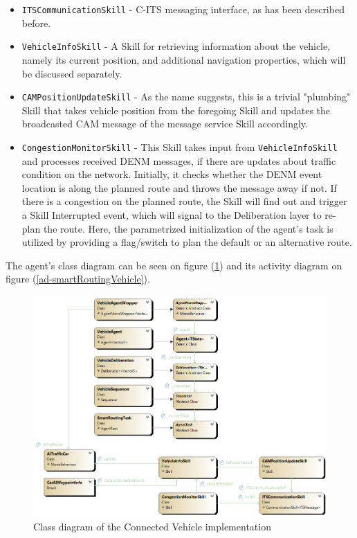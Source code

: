 \documentclass[main.tex]{subfiles}
\begin{document}
\begin{itemize}
    \item \texttt{ITSCommunicationSkill} - C-ITS messaging interface, as has been described before.
    \item \texttt{VehicleInfoSkill} - A Skill for retrieving information about the vehicle, namely 
    its current position, and additional navigation properties, which will be discussed separately.
    \item \texttt{CAMPositionUpdateSkill} - As the name suggests, this is a trivial "plumbing" Skill 
    that takes vehicle position from the foregoing Skill and updates the broadcasted CAM message of 
    the message service Skill accordingly.
    \item \texttt{CongestionMonitorSkill} - This Skill takes input from \texttt{VehicleInfoSkill} and 
    processes received DENM messages, if there are updates about traffic condition on the network. 
    Initially, it checks whether the DENM event location is along the planned route and throws the 
    message away if not. If there is a congestion on the planned route, the Skill will find out and 
    trigger a Skill Interrupted event, which will signal to the Deliberation layer to re-plan the route. 
    Here, the parametrized initialization of the agent's task is utilized by providing a flag/switch to 
    plan the default or an alternative route. 
\end{itemize}

The agent's class diagram can be seen on figure (\ref{cd-smartRoutingVehicle}) and its activity diagram 
on figure (\ref{ad-smartRoutingVehicle}).

\begin{figure}[htbp]
    \centering
    \includegraphics[width=.9\textwidth]{cd-SmartRoutingAgent.png}
    \caption{Class diagram of the Connected Vehicle implementation}
    \label{cd-smartRoutingVehicle}
\end{figure}
\end{document}
